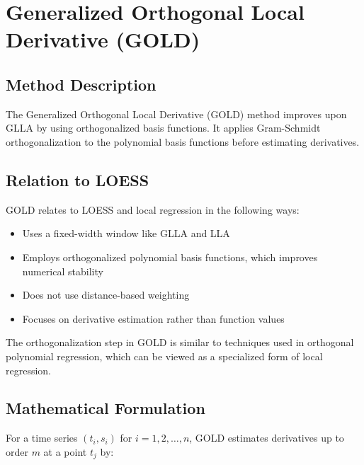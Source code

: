 \documentclass{article}
\begin{document}
\section{Generalized Orthogonal Local Derivative (GOLD)}

\subsection{Method Description}

The Generalized Orthogonal Local Derivative (GOLD) method improves upon GLLA by using orthogonalized basis functions. It applies Gram-Schmidt orthogonalization to the polynomial basis functions before estimating derivatives.

\subsection{Relation to LOESS}

GOLD relates to LOESS and local regression in the following ways:

\begin{itemize}
    \item Uses a fixed-width window like GLLA and LLA
    \item Employs orthogonalized polynomial basis functions, which improves numerical stability
    \item Does not use distance-based weighting
    \item Focuses on derivative estimation rather than function values
\end{itemize}

The orthogonalization step in GOLD is similar to techniques used in orthogonal polynomial regression, which can be viewed as a specialized form of local regression.

\subsection{Mathematical Formulation}

For a time series $(t_i, s_i)$ for $i = 1, 2, \ldots, n$, GOLD estimates derivatives up to order $m$ at a point $t_j$ by:
\end{document}
